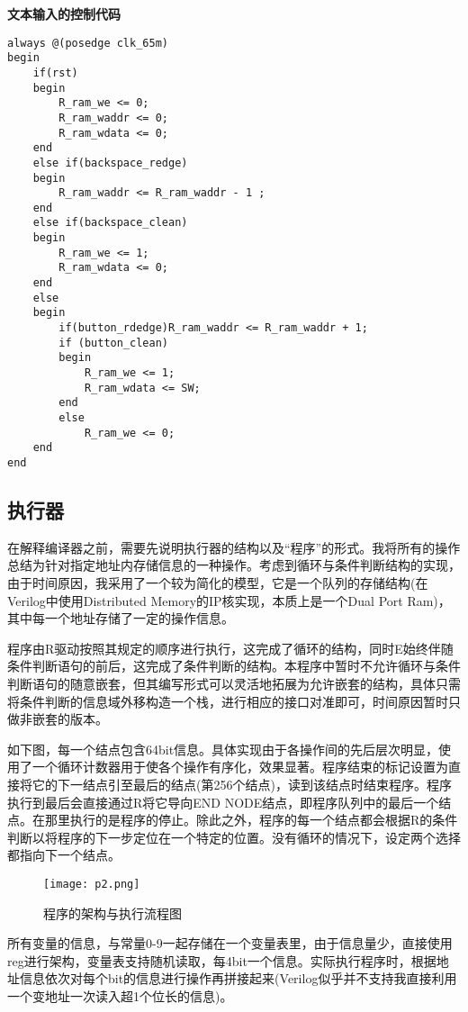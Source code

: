 \documentclass[lang=cn,11pt,a4paper]{elegantpaper}
\begin{document}
\textbf{文本输入的控制代码}

\begin{lstlisting}
always @(posedge clk_65m)
begin
    if(rst)
    begin
        R_ram_we <= 0;
        R_ram_waddr <= 0;
        R_ram_wdata <= 0;
    end
    else if(backspace_redge)
    begin
        R_ram_waddr <= R_ram_waddr - 1 ;
    end
    else if(backspace_clean)
    begin
        R_ram_we <= 1;
        R_ram_wdata <= 0;
    end
    else
    begin
        if(button_rdedge)R_ram_waddr <= R_ram_waddr + 1;
        if (button_clean)
        begin
            R_ram_we <= 1;
            R_ram_wdata <= SW;
        end
        else
            R_ram_we <= 0; 
    end
end
\end{lstlisting}

\subsection{执行器}

在解释编译器之前，需要先说明执行器的结构以及“程序”的形式。我将所有的操作总结为针对指定地址内存储信息的一种操作。考虑到循环与条件判断结构的实现，由于时间原因，我采用了一个较为简化的模型，它是一个队列的存储结构(在Verilog中使用Distributed Memory的IP核实现，本质上是一个Dual Port Ram)，其中每一个地址存储了一定的操作信息。

程序由R驱动按照其规定的顺序进行执行，这完成了循环的结构，同时E始终伴随条件判断语句的前后，这完成了条件判断的结构。本程序中暂时不允许循环与条件判断语句的随意嵌套，但其编写形式可以灵活地拓展为允许嵌套的结构，具体只需将条件判断的信息域外移构造一个栈，进行相应的接口对准即可，时间原因暂时只做非嵌套的版本。

如下图，每一个结点包含64bit信息。具体实现由于各操作间的先后层次明显，使用了一个循环计数器用于使各个操作有序化，效果显著。程序结束的标记设置为直接将它的下一结点引至最后的结点(第256个结点)，读到该结点时结束程序。程序执行到最后会直接通过R将它导向END NODE结点，即程序队列中的最后一个结点。在那里执行的是程序的停止。除此之外，程序的每一个结点都会根据R的条件判断以将程序的下一步定位在一个特定的位置。没有循环的情况下，设定两个选择都指向下一个结点。

\begin{figure}[H]
	\centering
	\texttt{[image: p2.png]}
	\caption{程序的架构与执行流程图}
\end{figure}

所有变量的信息，与常量0-9一起存储在一个变量表里，由于信息量少，直接使用reg进行架构，变量表支持随机读取，每4bit一个信息。实际执行程序时，根据地址信息依次对每个bit的信息进行操作再拼接起来(Verilog似乎并不支持我直接利用一个变地址一次读入超1个位长的信息)。
\end{document}
